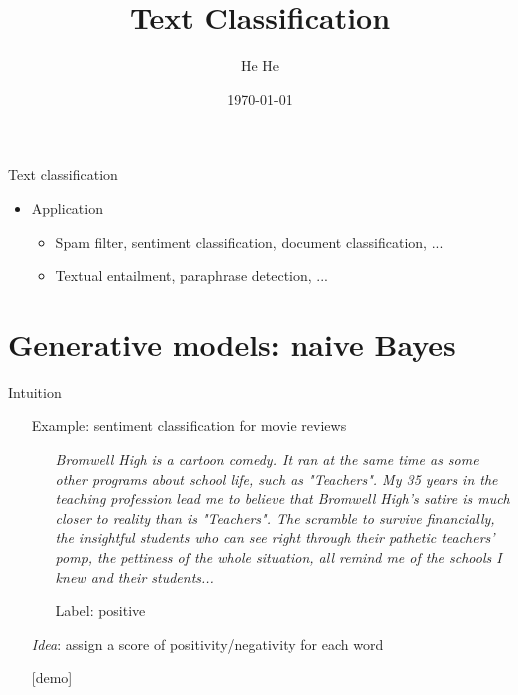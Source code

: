 \documentclass[usenames,dvipsnames,notes]{beamer}
\title[CSCI-GA.2590]{Text Classification}
\author[He He]{He He
}
\institute[NYU]{New York University}
\date{\today}
\begin{document}
\begin{frame}
\titlepage
\end{frame}

\begin{frame}
    {Text classification}
    \begin{itemize}
        \item Application
            \begin{itemize}
                \item Spam filter, sentiment classification, document classification, ...
                \item Textual entailment, paraphrase detection, ...
            \end{itemize}
    \end{itemize}
    \vspace{7em}
\end{frame}

\section{Generative models: naive Bayes}

\begin{frame}
    {Intuition}
    \begin{itemize}
        \itemsep1em
        \item[]Example: sentiment classification for movie reviews
    \begin{itemize}
        \item[] \textit{Bromwell High is a cartoon comedy. It ran at the same time as some other programs about school life, such as "Teachers". My 35 years in the teaching profession lead me to believe that Bromwell High's satire is much closer to reality than is "Teachers". The scramble to survive financially, the insightful students who can see right through their pathetic teachers' pomp, the pettiness of the whole situation, all remind me of the schools I knew and their students...}

        \item[] Label: positive 
    \end{itemize}
    \pause
\item[]\emph{Idea}: assign a score of positivity/negativity for each word

\item[][demo]
    \end{itemize}
\end{frame}
\end{document}
